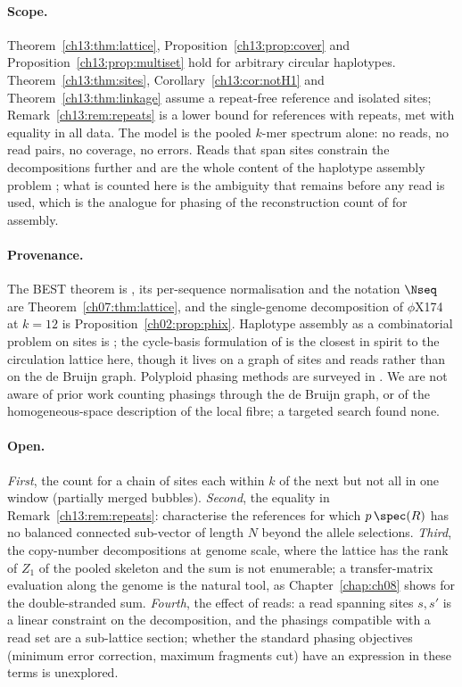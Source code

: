 \paragraph{Scope.} Theorem~\ref{ch13:thm:lattice}, Proposition~\ref{ch13:prop:cover} and
Proposition~\ref{ch13:prop:multiset} hold for arbitrary circular haplotypes. Theorem~\ref{ch13:thm:sites},
Corollary~\ref{ch13:cor:notH1} and Theorem~\ref{ch13:thm:linkage} assume a repeat-free reference and
isolated sites; Remark~\ref{ch13:rem:repeats} is a lower bound for references with repeats, met with
equality in all data. The model is the pooled $k$-mer spectrum alone: no reads, no read
pairs, no coverage, no errors. Reads that span sites constrain the decompositions further and
are the whole content of the haplotype assembly problem \cite{LBIL01,BB08,AI12}; what is
counted here is the ambiguity that remains before any read is used, which is the analogue for
phasing of the reconstruction count of \cite{KSP} for assembly.

\paragraph{Provenance.} The BEST theorem is \cite{BEST,SmithTutte}, its per-sequence
normalisation and the notation $\Nseq$ are Theorem~\ref{ch07:thm:lattice}, and the single-genome
decomposition of $\phi$X174 at $k=12$ is Proposition~\ref{ch02:prop:phix}. Haplotype assembly as a combinatorial problem on
sites is \cite{LBIL01}; the cycle-basis formulation of \cite{AI12} is the closest in spirit to
the circulation lattice here, though it lives on a graph of sites and reads rather than on the
de Bruijn graph. Polyploid phasing methods are surveyed in \cite{Garg21}. We are not aware of
prior work counting phasings through the de Bruijn graph, or of the homogeneous-space
description of the local fibre; a targeted search found none.

\paragraph{Open.} \emph{First}, the count for a chain of sites each within $k$ of the next
but not all in one window (partially merged bubbles). \emph{Second}, the equality in
Remark~\ref{ch13:rem:repeats}: characterise the references for which $p\,\spec(R)$ has no
balanced connected sub-vector of length $N$ beyond the allele selections. \emph{Third}, the
copy-number decompositions at genome scale, where the lattice has the rank of $Z_1$ of the
pooled skeleton and the sum is not enumerable; a transfer-matrix evaluation along the genome
is the natural tool, as Chapter~\ref{chap:ch08} shows for the double-stranded sum. \emph{Fourth}, the
effect of reads: a read spanning sites $s,s'$ is a linear constraint on the decomposition,
and the phasings compatible with a read set are a sub-lattice section; whether the standard
phasing objectives (minimum error correction, maximum fragments cut) have an expression in
these terms is unexplored.
